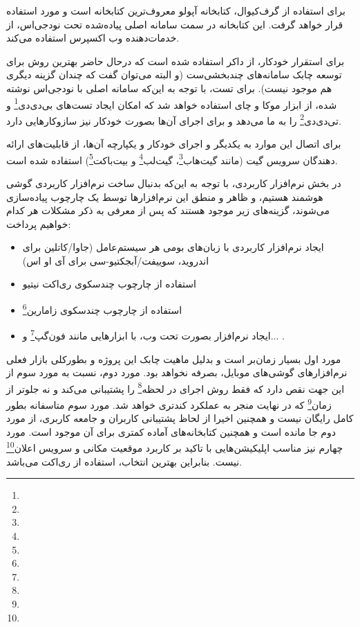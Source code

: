 برای استفاده از گرف‌کیوال، کتابخانه آپولو معروف‌ترین کتابخانه است و مورد استفاده قرار خواهد گرفت. این کتابخانه در سمت سامانه اصلی پیاده‌شده تحت نودجی‌اس، از خدمات‌دهنده وب اکسپرس استفاده می‌کند.\cite{apollo}




برای استقرار خودکار، از داکر استفاده شده است که درحال حاضر بهترین روش برای توسعه چابک سامانه‌های چندبخشی‌ست (و البته می‌توان گفت که چندان گزینه دیگری هم موجود نیست). برای تست، با توجه به این‌که سامانه اصلی با نودجی‌اس نوشته شده، از ابزار موکا و چای استفاده خواهد شد که امکان ایجاد تست‌های بی‌دی‌دی\footnote{} و تی‌دی‌دی\footnote{} را به ما می‌دهد و برای اجرای آن‌ها بصورت خودکار نیز سازوکارهایی دارد.

برای اتصال این موارد به یکدیگر و اجرای خودکار و یکپارچه آن‌ها، از قابلیت‌های  ارائه دهندگان سرویس گیت (مانند گیت‌هاب\footnote{}، گیت‌لب\footnote{} و بیت‌باکت\footnote{}) استفاده شده است.



در بخش نرم‌افزار کاربردی، با توجه به این‌که بدنبال ساخت نرم‌افزار کاربردی گوشی هوشمند هستیم، و ظاهر و منطق این نرم‌افزارها توسط یک چارچوب پیاده‌سازی می‌شوند، گزینه‌های زیر موجود هستند که پس از معرفی به ذکر مشکلات هر کدام خواهیم پرداخت:

\begin{itemize}
	\item ایجاد نرم‌افزار کاربردی با زبان‌های بومی هر سیستم‌عامل (جاوا/کاتلین برای اندروید، سوییفت/آبجکتیو-سی برای آی او اس)
	\item استفاده از چارچوب چندسکوی ری‌اکت نیتیو
	\item استفاده از چارچوب چندسکوی زامارین\footnote{}
	\item ایجاد نرم‌افزار بصورت تحت وب، با ابزارهایی مانند فون‌گپ\footnote{} و... .
\end{itemize}

مورد اول بسیار زمان‌بر است و بدلیل ماهیت چابک این پروژه و بطورکلی بازار فعلی نرم‌افزارهای گوشی‌های موبایل، بصرفه نخواهد بود. مورد دوم، نسبت به مورد سوم از این جهت نقص دارد که فقط روش اجرای در لحظه\footnote{} را پشتیبانی می‌کند و نه جلوتر از زمان\footnote{} که در نهایت منجر به عملکرد کندتری خواهد شد. مورد سوم متاسفانه بطور کامل رایگان نیست و همچنین اخیرا از لحاظ پشتیبانی کاربران و جامعه کاربری، از مورد دوم جا مانده است و همچنین کتابخانه‌های آماده کمتری برای آن موجود است. مورد چهارم نیز مناسب اپلیکیشن‌هایی با تاکید بر کاربرد موقعیت مکانی و سرویس اعلان\footnote{} نیست. بنابراین بهترین انتخاب، استفاده از ری‌اکت می‌باشد.

